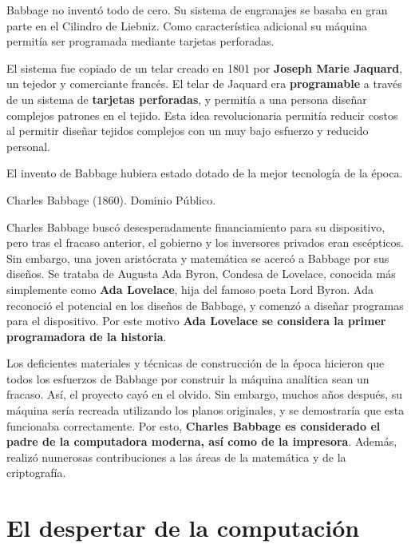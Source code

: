 \begin{knowwhat}
Babbage no inventó todo de cero. Su sistema de engranajes se basaba en gran
parte en el Cilindro de Liebniz. Como característica adicional su máquina
permitía ser programada mediante tarjetas perforadas.

El sistema fue copiado de un telar creado en 1801 por \textbf{Joseph Marie
Jaquard}, un tejedor y comerciante francés. El telar de Jaquard era
\textbf{programable} a través de un sistema de \textbf{tarjetas perforadas}, y
permitía a una persona diseñar complejos patrones en el tejido. Esta idea
revolucionaria permitía reducir costos al permitir diseñar tejidos complejos con
un muy bajo esfuerzo y reducido personal.

El invento de Babbage hubiera estado dotado de la mejor tecnología de la época.
\end{knowwhat}

{Charles Babbage (1860).}
{Dominio Público.}

Charles Babbage buscó desesperadamente financiamiento para su dispositivo, pero
tras el fracaso anterior, el gobierno y los inversores privados eran escépticos.
Sin embargo, una joven aristócrata y matemática se acercó a Babbage por sus
diseños. Se trataba de Augusta Ada Byron, Condesa de Lovelace, conocida más
simplemente como \textbf{Ada Lovelace}, hija del famoso poeta Lord Byron.
Ada reconoció el potencial en los diseños de Babbage, y comenzó a diseñar
programas para el dispositivo. Por este motivo \textbf{Ada Lovelace se considera
la primer programadora de la historia}.\autocite{fuegi_2003}

Los deficientes materiales y técnicas de construcción de la época hicieron que
todos los esfuerzos de Babbage por construir la máquina analítica sean un
fracaso. Así, el proyecto cayó en el olvido. Sin embargo, muchos años después,
su máquina sería recreada utilizando los planos originales, y se demostraría que
esta funcionaba correctamente. Por esto, \textbf{Charles Babbage es considerado
el padre de la computadora moderna, así como de la impresora}. Además, realizó
numerosas contribuciones a las áreas de la matemática y de la criptografía.

\section{El despertar de la computación}

